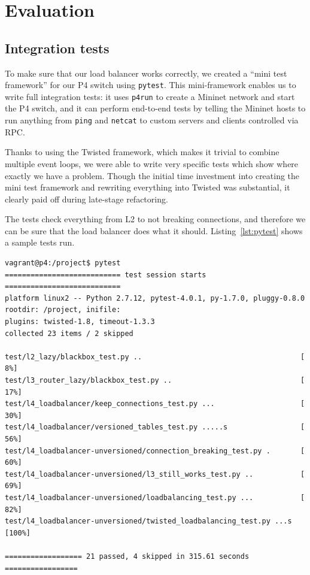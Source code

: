 \documentclass[11pt,oneside,a4paper]{article}
\begin{document}
\section{Evaluation}
\subsection{Integration tests}

To make sure that our load balancer works correctly, we created a ``mini test
framework'' for our P4 switch using \texttt{pytest}\cite{pytest}.
This mini-framework enables us to write full integration tests: it uses
\texttt{p4run} to create a Mininet network and start the P4 switch, and it
can perform end-to-end tests by telling the Mininet hosts to run anything
from \texttt{ping} and \texttt{netcat} to custom servers and clients controlled
via RPC.

Thanks to using the Twisted framework, which makes it trivial to combine
multiple event loops, we were able to write very specific
tests which show where exactly we have a problem.
Though the initial time investment into creating the mini test framework and
rewriting everything into Twisted was substantial, it clearly paid off during
late-stage refactoring.

The tests check everything from L2 to not breaking connections, and therefore we
can be sure that the load balancer does what it should.
Listing~\ref{lst:pytest} shows a sample tests run.

\begin{lstlisting}[basicstyle=\ttfamily\small,caption=A sample test
                   session,captionpos=b,label=lst:pytest]
vagrant@p4:/project$ pytest                                          
=========================== test session starts ===========================
platform linux2 -- Python 2.7.12, pytest-4.0.1, py-1.7.0, pluggy-0.8.0
rootdir: /project, inifile:
plugins: twisted-1.8, timeout-1.3.3
collected 23 items / 2 skipped

test/l2_lazy/blackbox_test.py ..                                     [  8%]
test/l3_router_lazy/blackbox_test.py ..                              [ 17%]
test/l4_loadbalancer/keep_connections_test.py ...                    [ 30%]
test/l4_loadbalancer/versioned_tables_test.py .....s                 [ 56%]
test/l4_loadbalancer-unversioned/connection_breaking_test.py .       [ 60%]
test/l4_loadbalancer-unversioned/l3_still_works_test.py ..           [ 69%]
test/l4_loadbalancer-unversioned/loadbalancing_test.py ...           [ 82%]
test/l4_loadbalancer-unversioned/twisted_loadbalancing_test.py ...s  [100%]

================== 21 passed, 4 skipped in 315.61 seconds =================
\end{lstlisting}
\end{document}
